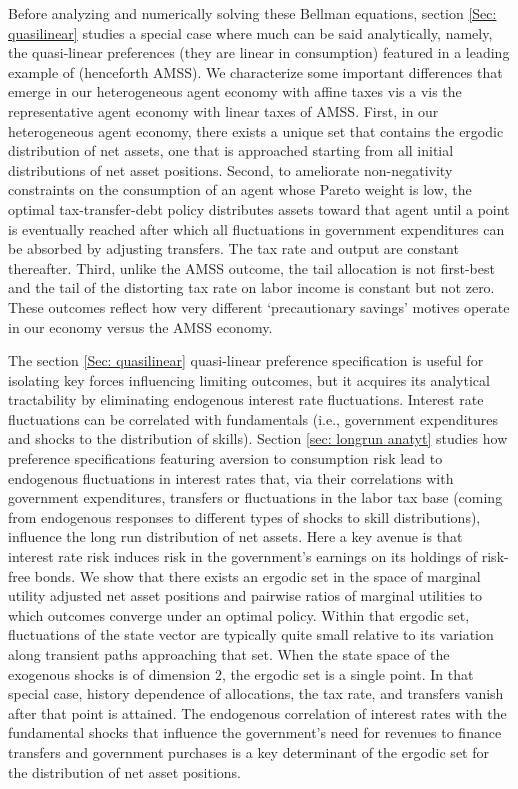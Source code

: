\documentclass[thmsb,11pt]{article}
\begin{document}
Before analyzing and numerically solving  these Bellman equations, section \ref{Sec: quasilinear}
studies a special case where much can be said analytically, namely,
the  quasi-linear preferences  (they are linear in consumption) featured in a leading example of \citet{Aiyagari2002} (henceforth AMSS).  We characterize some important
 differences that emerge in our heterogeneous agent economy with affine taxes vis a vis the representative agent economy with
 linear taxes of AMSS.   First, in our heterogeneous agent economy,  there exists a unique set  that contains the ergodic distribution of net  assets, one that is approached starting from  all initial
 distributions of net asset positions.  Second, to ameliorate   non-negativity constraints on the consumption of an  agent whose Pareto weight is low, the optimal tax-transfer-debt policy  distributes assets  toward that agent  until a point is eventually  reached after which  all fluctuations in government expenditures can be absorbed by adjusting transfers. The tax rate and  output are constant thereafter.  Third,   unlike the AMSS outcome,
 the tail allocation is not first-best and the tail of the distorting tax rate on labor income is constant but not zero.
 These outcomes reflect how very different `precautionary savings' motives operate in our economy versus the AMSS economy.

 The section \ref{Sec: quasilinear} quasi-linear preference specification  is useful for  isolating  key forces influencing
 limiting outcomes, but it acquires its analytical tractability by eliminating endogenous interest rate fluctuations.
  Interest rate fluctuations can be  correlated with   fundamentals (i.e., government expenditures and  shocks to the distribution
 of skills).  Section \ref{sec: longrun anatyt} studies how preference specifications
  featuring aversion to consumption risk lead to  endogenous fluctuations in  interest rates that, via their correlations with government
   expenditures, transfers or fluctuations in the labor tax base (coming from endogenous responses to different types of shocks to skill distributions), influence the long run  distribution of net assets. Here a  key avenue is that interest rate risk induces risk in the government's earnings on its  holdings of risk-free bonds.  We show that there exists an ergodic set   in the space of marginal utility adjusted net asset positions and pairwise ratios of marginal utilities to which outcomes converge under an optimal policy.  Within that ergodic set, fluctuations of the state vector are
    typically quite small relative to its variation along transient paths approaching that set. When the state space of the exogenous shocks is of dimension $2$, the ergodic set is a single point. In that special case, history dependence
      of allocations, the tax rate, and transfers vanish after that point is attained.  The  endogenous correlation of interest rates with the fundamental shocks
    that influence the government's  need for  revenues to finance transfers and government purchases is a key determinant of the ergodic set for the distribution of net asset positions.
\end{document}
